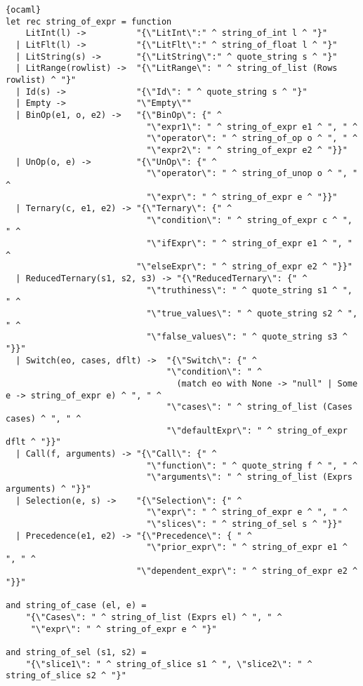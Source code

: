 \begin{lstlisting}{ocaml}
let rec string_of_expr = function
    LitInt(l) ->          "{\"LitInt\":" ^ string_of_int l ^ "}"
  | LitFlt(l) ->          "{\"LitFlt\":" ^ string_of_float l ^ "}"
  | LitString(s) ->       "{\"LitString\":" ^ quote_string s ^ "}"
  | LitRange(rowlist) ->  "{\"LitRange\": " ^ string_of_list (Rows rowlist) ^ "}"
  | Id(s) ->              "{\"Id\": " ^ quote_string s ^ "}"
  | Empty ->              "\"Empty\""
  | BinOp(e1, o, e2) ->   "{\"BinOp\": {" ^
                            "\"expr1\": " ^ string_of_expr e1 ^ ", " ^
                            "\"operator\": " ^ string_of_op o ^ ", " ^
                            "\"expr2\": " ^ string_of_expr e2 ^ "}}"
  | UnOp(o, e) ->         "{\"UnOp\": {" ^
                            "\"operator\": " ^ string_of_unop o ^ ", " ^
                            "\"expr\": " ^ string_of_expr e ^ "}}"
  | Ternary(c, e1, e2) -> "{\"Ternary\": {" ^
                            "\"condition\": " ^ string_of_expr c ^ ", " ^
                            "\"ifExpr\": " ^ string_of_expr e1 ^ ", " ^
                          "\"elseExpr\": " ^ string_of_expr e2 ^ "}}"
  | ReducedTernary(s1, s2, s3) -> "{\"ReducedTernary\": {" ^
                            "\"truthiness\": " ^ quote_string s1 ^ ", " ^
                            "\"true_values\": " ^ quote_string s2 ^ ", " ^
                            "\"false_values\": " ^ quote_string s3 ^ "}}"
  | Switch(eo, cases, dflt) ->  "{\"Switch\": {" ^
                                "\"condition\": " ^
                                  (match eo with None -> "null" | Some e -> string_of_expr e) ^ ", " ^
                                "\"cases\": " ^ string_of_list (Cases cases) ^ ", " ^
                                "\"defaultExpr\": " ^ string_of_expr dflt ^ "}}"
  | Call(f, arguments) -> "{\"Call\": {" ^
                            "\"function\": " ^ quote_string f ^ ", " ^
                            "\"arguments\": " ^ string_of_list (Exprs arguments) ^ "}}"
  | Selection(e, s) ->    "{\"Selection\": {" ^
                            "\"expr\": " ^ string_of_expr e ^ ", " ^
                            "\"slices\": " ^ string_of_sel s ^ "}}"
  | Precedence(e1, e2) -> "{\"Precedence\": { " ^
                            "\"prior_expr\": " ^ string_of_expr e1 ^ ", " ^
                          "\"dependent_expr\": " ^ string_of_expr e2 ^ "}}"

and string_of_case (el, e) =
    "{\"Cases\": " ^ string_of_list (Exprs el) ^ ", " ^
     "\"expr\": " ^ string_of_expr e ^ "}"

and string_of_sel (s1, s2) =
    "{\"slice1\": " ^ string_of_slice s1 ^ ", \"slice2\": " ^ string_of_slice s2 ^ "}"


\end{lstlisting}

